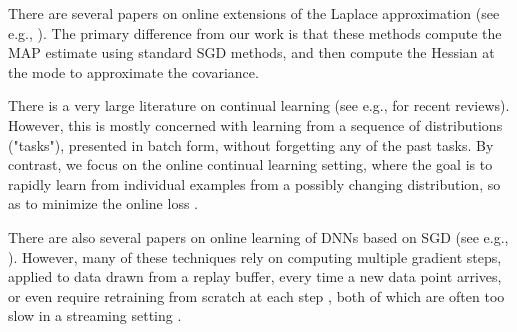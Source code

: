 There are  several papers on online extensions of the Laplace approximation
(see e.g., \citep{Ritter2018online,Daxberger2021laplace}).
The primary difference from our work is that these methods compute the MAP estimate using standard SGD methods, and then compute the Hessian at the mode
 to approximate the covariance.


 There is a very large literature on continual learning
 (see e.g., \citep{Wang2023CL,Mai2022,Delange2021,Mundt2023} for recent reviews).
 However, this is mostly concerned with learning from a sequence of distributions ("tasks"),
 presented in batch form,
 without forgetting any of the past tasks.
 By contrast, we focus on the online continual learning setting,
 where the goal is to rapidly
 learn from  individual examples from a possibly
 changing distribution, so as to
minimize the online loss \citep{Cai2021,Ghunaim2023,Dawid99,Gama2013}.
 
 There are also several papers on online learning of DNNs based on SGD
 (see e.g., \citep{Hu2021onepass,Ash2020,Dohare2021,Xu2021}).
However, many of these techniques 
 rely on computing multiple gradient steps,
 applied to data drawn from  a replay buffer,
 every time a new data point arrives,
 or even require retraining from scratch
 at each step
 \citep{Paria2022},
 both of which are often too slow in a streaming setting
\citep{Ghunaim2023}.

 

 